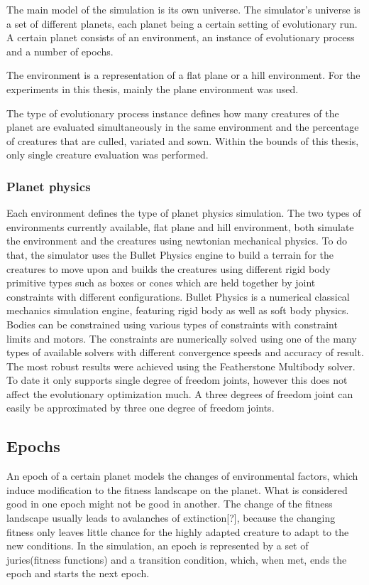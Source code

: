 \documentclass[main]{subfiles}
\begin{document}
The main model of the simulation is its own universe. The simulator's universe is a set of different planets, each planet being a certain setting of evolutionary run. A certain planet consists of an environment, an instance of evolutionary process and a number of epochs. 

The environment is a representation of a flat plane or a hill environment. For the experiments in this thesis, mainly the plane environment was used.

The type of evolutionary process instance defines how many creatures of the planet are evaluated simultaneously in the same environment and the percentage of creatures that are culled, variated and sown. Within the bounds of this thesis, only single creature evaluation was performed. 

\subsubsection{Planet physics}

Each environment defines the type of planet physics simulation. The two types of environments currently available, flat plane and hill environment, both simulate the environment and the creatures using newtonian mechanical physics. To do that, the simulator uses the Bullet Physics engine\cite{bulletphysics} to build a terrain for the creatures to move upon and builds the creatures using different rigid body primitive types such as boxes or cones which are held together by joint constraints with different configurations. Bullet Physics is a numerical classical mechanics simulation engine, featuring rigid body as well as soft body physics. Bodies can be constrained using various types of constraints with constraint limits and motors. The constraints are numerically solved using one of the many types of available solvers with different convergence speeds and accuracy of result. The most robust results were achieved using the Featherstone Multibody solver. To date it only supports single degree of freedom joints, however this does not affect the evolutionary optimization much. A three degrees of freedom joint can easily be approximated by three one degree of freedom joints.

\subsection{Epochs}

An epoch of a certain planet models the changes of environmental factors, which induce modification to the fitness landscape on the planet. What is considered good in one epoch might not be good in another. The change of the fitness landscape usually leads to avalanches of extinction[?], because the changing fitness only leaves little chance for the highly adapted creature to adapt to the new conditions. In the simulation, an epoch  is represented by a set of juries(fitness functions) and a transition condition, which, when met, ends the epoch and starts the next epoch.
\end{document}

